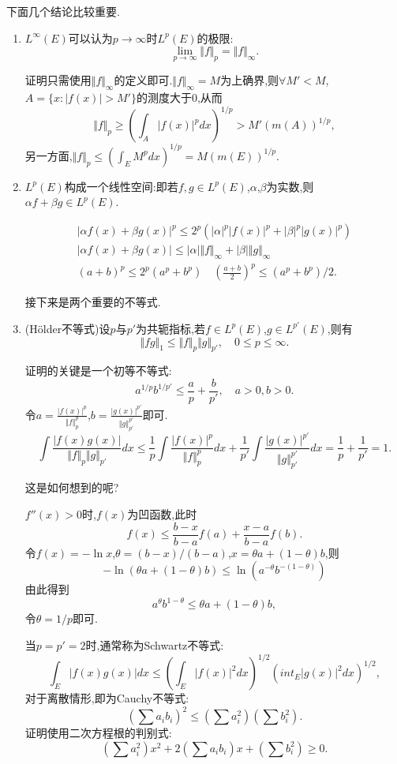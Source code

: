 \documentclass[12pt,a4paper,openany]{book}
\begin{document}
下面几个结论比较重要.

\begin{enumerate}
\item $L^{\infty}(E)$可以认为$p \rightarrow \infty$时$L^p(E)$的极限:
\[
\lim_{p \rightarrow \infty}{\Vert{f}\Vert_p} = \Vert{f}\Vert_{\infty}.
\]

证明只需使用$\Vert{f}\Vert_{\infty}$的定义即可.$\Vert{f}\Vert_{\infty}=M$为上确界,则$\forall M'<M$,$A = \{x: |f(x)|>M'\}$的测度大于0,从而
\[
\Vert{f}\Vert_p \ge (\int_{A}{|f(x)|^pdx})^{1/p}>M'(m(A))^{1/p},
\]
另一方面,$\Vert{f}\Vert_p \le (\int_{E}{M^pdx})^{1/p}=M(m(E))^{1/p}$.

\item $L^p(E)$构成一个线性空间:即若$f,g \in L^p(E)$,$\alpha$,$\beta$为实数,则$\alpha{f}+\beta{g} \in L^p(E)$.

\begin{gather*}
|\alpha{}f(x)+\beta{}g(x)|^p \le 2^p(|\alpha|^p|f(x)|^p + |\beta|^p|g(x)|^p) \\
|\alpha{}f(x) + \beta{}g(x)| \le |\alpha|\Vert{f}\Vert_{\infty} + |\beta|\Vert{g}\Vert_{\infty} \\
(a + b)^p \le 2^p(a^p + b^p) \quad (\frac{a+b}{2})^p \le (a^p + b^p)/2.
\end{gather*}

接下来是两个重要的不等式.

\item (H\"older不等式)设$p$与$p'$为共轭指标,若$f \in L^p(E)$,$g \in L^{p'}(E)$,则有
\[
\Vert{fg}\Vert_1 \le \Vert{f}\Vert_p\Vert{g}\Vert_{p'},\quad 0 \le p \le \infty.
\]

证明的关键是一个初等不等式:
\[
a^{1/p}b^{1/p'} \le \frac{a}{p} + \frac{b}{p'}, \quad a>0,b>0.
\]
令$a = \frac{|f(x)|^p}{\Vert{f}\Vert_p^p}$,$b = \frac{|g(x)|^{p'}}{\Vert{g}\Vert_{p'}^{p'}}$即可.
\[
\int{\frac{|f(x)g(x)|}{\Vert{f}\Vert_{p}\Vert{g}\Vert_{p'}}dx} \le \frac{1}{p}\int{\frac{|f(x)|^p}{\Vert{f}\Vert_p^p}dx} + \frac{1}{p'}\int{\frac{|g(x)|^{p'}}{\Vert{g}\Vert_{p'}^{p'}}dx} = \frac{1}{p} + \frac{1}{p'} = 1.
\]

这是如何想到的呢?

$f''(x) > 0$时,$f(x)$为凹函数,此时
\[
f(x) \le \frac{b-x}{b-a}f(a) + \frac{x-a}{b-a}f(b).
\]
令$f(x)=-\ln{x}$,$\theta=(b-x)/(b-a)$,$x=\theta{}a + (1-\theta)b$,则
\[
-\ln{(\theta{}a + (1 - \theta)b)} \le \ln(a^{-\theta}b^{-(1 - \theta)})
\]
由此得到
\[
a^{\theta}b^{1-\theta} \le \theta{}a + (1 - \theta)b,
\]
令$\theta = 1/p$即可.

当$p=p'=2$时,通常称为Schwartz不等式:
\[
\int_{E}{|f(x)g(x)|dx} \le (\int_{E}{|f(x)|^2dx})^{1/2}(int_{E}{|g(x)|^2dx})^{1/2},
\]
对于离散情形,即为Cauchy不等式:
\[
(\sum{a_ib_i})^2 \le (\sum{a_i^2})(\sum{b_i^2}).
\]
证明使用二次方程根的判别式:
\[
(\sum{a_i^2})x^2 + 2(\sum{a_ib_i})x + (\sum{b_i^2}) \ge 0.
\]


\end{enumerate}
\end{document}
